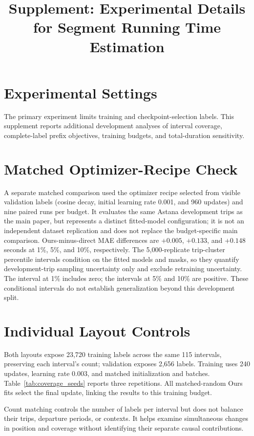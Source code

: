 \documentclass[journal]{IEEEtran}
\begin{document}
\title{Supplement: Experimental Details for Segment Running Time Estimation}
\author{}
\maketitle
\section{Experimental Settings}
The primary experiment limits training and checkpoint-selection labels. This supplement reports additional development analyses of interval coverage, complete-label prefix objectives, training budgets, and total-duration sensitivity.

\section{Matched Optimizer-Recipe Check}

A separate matched comparison used the optimizer recipe selected from visible validation labels (cosine decay, initial learning rate 0.001, and 960 updates) and nine paired runs per budget. It evaluates the same Astana development trips as the main paper, but represents a distinct fitted-model configuration; it is not an independent dataset replication and does not replace the budget-specific main comparison. Ours-minus-direct MAE differences are $+0.005$, $+0.133$, and $+0.148$ seconds at 1\%, 5\%, and 10\%, respectively. The 5,000-replicate trip-cluster percentile intervals condition on the fitted models and masks, so they quantify development-trip sampling uncertainty only and exclude retraining uncertainty. The interval at 1\% includes zero; the intervals at 5\% and 10\% are positive. These conditional intervals do not establish generalization beyond this development split.

\section{Individual Layout Controls}

Both layouts expose 23,720 training labels across the same 115 intervals, preserving each interval's count; validation exposes 2,656 labels. Training uses 240 updates, learning rate 0.003, and matched initialization and batches. Table~\ref{tab:coverage_seeds} reports three repetitions. All matched-random Ours fits select the final update, linking the results to this training budget.

Count matching controls the number of labels per interval but does not balance their trips, departure periods, or contexts. It helps examine simultaneous changes in position and coverage without identifying their separate causal contributions.
\end{document}
